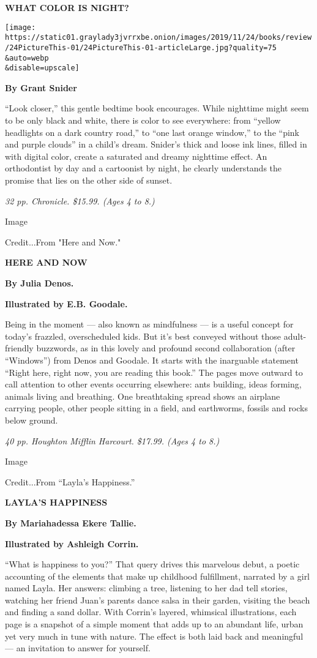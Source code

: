 \textbf{WHAT COLOR IS NIGHT?}

\texttt{[image: https://static01.graylady3jvrrxbe.onion/images/2019/11/24/books/review/24PictureThis-01/24PictureThis-01-articleLarge.jpg?quality=75\\\&auto=webp\\\&disable=upscale]}

\textbf{By Grant Snider}

``Look closer,'' this gentle bedtime book encourages. While nighttime
might seem to be only black and white, there is color to see everywhere:
from ``yellow headlights on a dark country road,'' to ``one last orange
window,'' to the ``pink and purple clouds'' in a child's dream. Snider's
thick and loose ink lines, filled in with digital color, create a
saturated and dreamy nighttime effect. An orthodontist by day and a
cartoonist by night, he clearly understands the promise that lies on the
other side of sunset.

\emph{32 pp. Chronicle. \$15.99. (Ages 4 to 8.)}

Image

Credit...From "Here and Now."

\textbf{HERE AND NOW}

\textbf{By Julia Denos.}

\textbf{Illustrated by E.B. Goodale.}

Being in the moment --- also known as mindfulness --- is a useful
concept for today's frazzled, overscheduled kids. But it's best conveyed
without those adult-friendly buzzwords, as in this lovely and profound
second collaboration (after ``Windows'') from Denos and Goodale. It
starts with the inarguable statement ``Right here, right now, you are
reading this book.'' The pages move outward to call attention to other
events occurring elsewhere: ants building, ideas forming, animals living
and breathing. One breathtaking spread shows an airplane carrying
people, other people sitting in a field, and earthworms, fossils and
rocks below ground.

\emph{40 pp. Houghton Mifflin Harcourt. \$17.99. (Ages 4 to 8.)}

Image

Credit...From ``Layla's Happiness.''

\textbf{LAYLA'S HAPPINESS}

\textbf{By Mariahadessa Ekere Tallie.}

\textbf{Illustrated by Ashleigh Corrin.}

``What is happiness to you?'' That query drives this marvelous debut, a
poetic accounting of the elements that make up childhood fulfillment,
narrated by a girl named Layla. Her answers: climbing a tree, listening
to her dad tell stories, watching her friend Juan's parents dance salsa
in their garden, visiting the beach and finding a sand dollar. With
Corrin's layered, whimsical illustrations, each page is a snapshot of a
simple moment that adds up to an abundant life, urban yet very much in
tune with nature. The effect is both laid back and meaningful --- an
invitation to answer for yourself.

